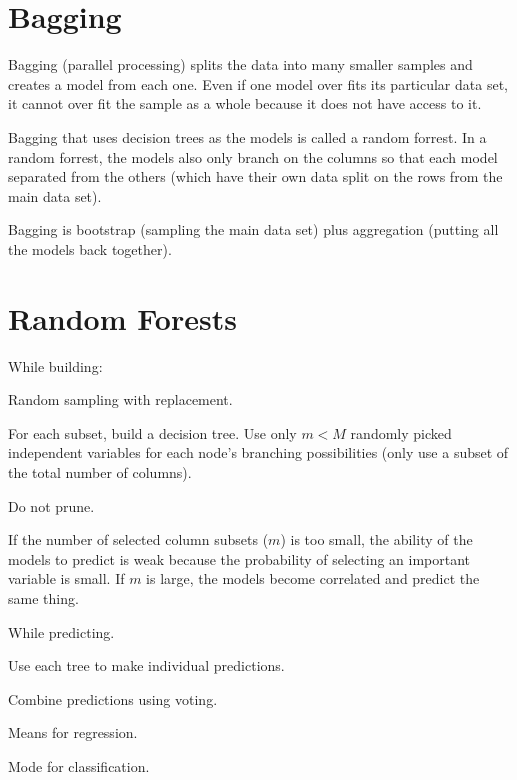 	\section{Bagging}
Bagging (parallel processing) splits the data into many smaller samples and creates a model from each one.  Even if one model over fits its particular data set, it cannot over fit the sample as a whole because it does not have access to it.

Bagging that uses decision trees as the models is called a random forrest.  In a random forrest, the models also only branch on the columns so that each model separated from the others (which have their own data split on the rows from the main data set).

Bagging is bootstrap (sampling the main data set) plus aggregation (putting all the models back together).

	\section{Random Forests}
While building:
	\begin{bulletedlist}
		\item Random sampling with replacement.
		\item For each subset, build a decision tree.  Use only $m<M$ randomly picked independent variables for each node's branching possibilities (only use a subset of the total number of columns).
		\item Do not prune.
	\end{bulletedlist}
If the number of selected column subsets ($m$) is too small, the ability of the models to predict is weak because the probability of selecting an important variable is small.  If $m$ is large, the models become correlated and predict the same thing.

While predicting.
	\begin{bulletedlist}
		\item Use each tree to make individual predictions.
		\item Combine predictions using voting.
		\begin{bulletedlist}
			\item Means for regression.
			\item Mode for classification.
		\end{bulletedlist}
	\end{bulletedlist}

